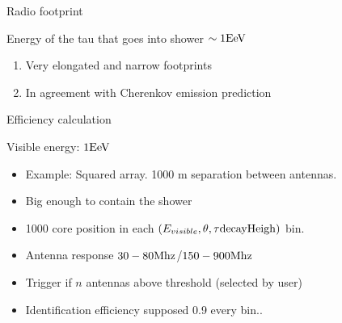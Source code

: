 \documentclass[11pt]{beamer}
\begin{document}
\begin{frame}{Radio footprint}
		\scriptsize
		\begin{block}{Energy of the tau that goes into shower $\sim1{\rm EeV}$}
			\begin{center}
			\end{center}
		\end{block}
		\begin{alertblock}{}
			\begin{enumerate}
			 \item Very elongated and narrow footprints
			 \item In agreement with Cherenkov emission prediction
			\end{enumerate}
		\end{alertblock}
\end{frame}


\begin{frame}{Efficiency calculation}
		\scriptsize
		\begin{block}{Visible energy: $1{\rm EeV}$}
			\begin{center}
			\hfill
			\end{center}
		\end{block}
		\begin{alertblock}{}
			\begin{itemize}
			 \item Example: Squared array. 1000 m separation between antennas. 
			 \item Big enough to contain the shower
			 \item 1000 core position in each $(E_{visible},\theta,\tau{\rm decayHeigh})$ bin.
			 \item Antenna response $30-80{\rm Mhz}$/$150-900{\rm Mhz}$
			 \item Trigger if $n$ antennas above threshold (selected by user)
			 \item Identification efficiency supposed 0.9 every bin..
			\end{itemize}
		\end{alertblock}
\end{frame}
\end{document}
